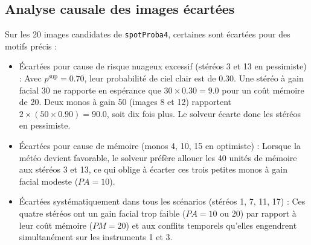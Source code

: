 \subsection{Analyse causale des images écartées}
Sur les 20 images candidates de \texttt{spotProba4}, certaines sont écartées pour des motifs précis :
\begin{itemize}
    \item Écartées pour cause de risque nuageux excessif (stéréos 3 et 13 en pessimiste) : Avec $p^{\sup}=0.70$, leur probabilité de ciel clair est de $0.30$. Une stéréo à gain facial 30 ne rapporte en espérance que $30 \times 0.30 = 9.0$ pour un coût mémoire de 20. Deux monos à gain 50 (images 8 et 12) rapportent $2 \times (50 \times 0.90) = 90.0$, soit dix fois plus. Le solveur écarte donc les stéréos en pessimiste.
    \item Écartées pour cause de mémoire (monos 4, 10, 15 en optimiste) : Lorsque la météo devient favorable, le solveur préfère allouer les 40 unités de mémoire aux stéréos 3 et 13, ce qui oblige à écarter ces trois petites monos à gain facial modeste ($PA=10$).
    \item Écartées systématiquement dans tous les scénarios (stéréos 1, 7, 11, 17) : Ces quatre stéréos ont un gain facial trop faible ($PA=10$ ou $20$) par rapport à leur coût mémoire ($PM=20$) et aux conflits temporels qu'elles engendrent simultanément sur les instruments 1 et 3.
\end{itemize}
